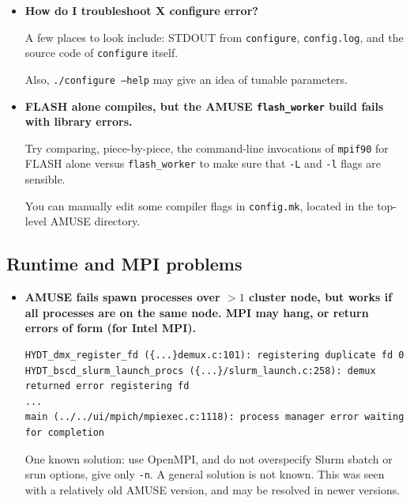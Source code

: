 \documentclass[10pt]{article}
\begin{document}
\begin{itemize}

    \item \textbf{How do I troubleshoot X configure error?}

		A few places to look include: STDOUT from \texttt{configure},
		\texttt{config.log}, and the source code of \texttt{configure} itself.

		Also, \texttt{./configure --help} may give an idea of tunable
		parameters.

    \item \textbf{FLASH alone compiles, but the AMUSE \texttt{flash\_worker} build
        fails with library errors.}

		Try comparing, piece-by-piece, the command-line invocations of
        \texttt{mpif90} for FLASH alone versus \texttt{flash\_worker} to make
        sure that \texttt{-L} and \texttt{-l} flags are sensible.

        You can manually edit some compiler flags in \texttt{config.mk},
        located in the top-level AMUSE directory.

\end{itemize}

\subsection{Runtime and MPI problems}

\begin{itemize}

    \item \textbf{AMUSE fails spawn processes over $>1$ cluster node, but works if all
        processes are on the same node.  MPI may hang, or return errors of form
        (for Intel MPI).}

\begin{verbatim}
HYDT_dmx_register_fd ({...}demux.c:101): registering duplicate fd 0
HYDT_bscd_slurm_launch_procs ({...}/slurm_launch.c:258): demux returned error registering fd
...
main (../../ui/mpich/mpiexec.c:1118): process manager error waiting for completion
\end{verbatim}

		One known solution: use OpenMPI, and do not overspecify Slurm
		sbatch or srun options, give only \texttt{-n}.  A general solution is
		not known.  This was seen with a relatively old AMUSE version, and may
		be resolved in newer versions.


\end{itemize}
\end{document}
